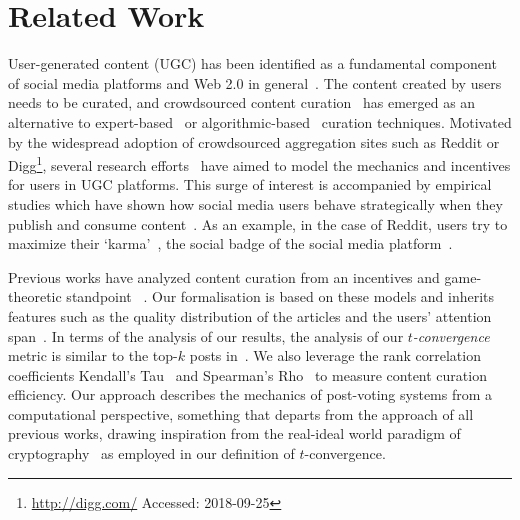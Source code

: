 \section{Related Work}
User-generated content (UGC) has been identified as a fundamental component of social media platforms and Web 2.0 in general~\cite{kaplan2010users}. The content created by users needs to be curated, and crowdsourced content curation~\cite{askalidis2013theoretical} has emerged as an alternative to expert-based~\cite{stanoevska2012content} or algorithmic-based~\cite{rader2015understanding} curation techniques. Motivated by the widespread adoption of crowdsourced aggregation sites such as Reddit or Digg\footnote{\url{http://digg.com/} Accessed: 2018-09-25}, several research efforts~\cite{das2010ranking,ghosh2011incentivizing,abbassi2014distributed} have aimed to model the mechanics and incentives for users in UGC platforms. This surge of interest is accompanied by empirical studies which have shown how
social media users behave strategically when they publish and consume content~\cite{may2014filter}. As an example, in the case of Reddit, users try to maximize their `karma'~\cite{bergstrom2011don}, the social badge of the social media platform~\cite{anderson2013steering}.

Previous works have analyzed content curation from an incentives and game-theoretic standpoint~\cite{ghosh2011incentivizing,das2010ranking,gupte2009news,may2014filter,abbassi2014distributed} . Our formalisation is based on these models and inherits features such as the quality distribution of the articles and the users' attention span~\cite{askalidis2013theoretical,ghosh2011incentivizing}. In terms of the analysis of our results, the analysis of our \textit{$t$-convergence} metric is similar to the top-$k$ posts in~\cite{askalidis2013theoretical}. We also leverage the rank correlation coefficients Kendall's Tau~\cite{kendall1955rank} and Spearman's Rho~\cite{spearman1904proof} to measure content curation efficiency.
Our approach describes the mechanics of post-voting systems from a computational perspective, something that departs from the approach of all previous works, drawing inspiration from the real-ideal world paradigm of cryptography~\cite{goldreich1999foundations,lindell} as employed in our definition of $t$-convergence.

